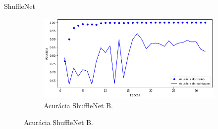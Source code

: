 \begin{frame}{ShuffleNet}
\begin{figure}[h!]
\begin{subfigure}{0.3\linewidth}
    \end{subfigure}
    \hspace{1.5cm}
    \begin{subfigure}{0.3\linewidth}
      \caption{Acurácia ShuffleNet B.\label{subfig:alexnet-b-acc}}
      \includegraphics[width=\linewidth]{img/shufflenet-b-acc}%
    \end{subfigure}
    \label{fig:treinamento-alexnet}
  \end{figure}
\end{frame}

